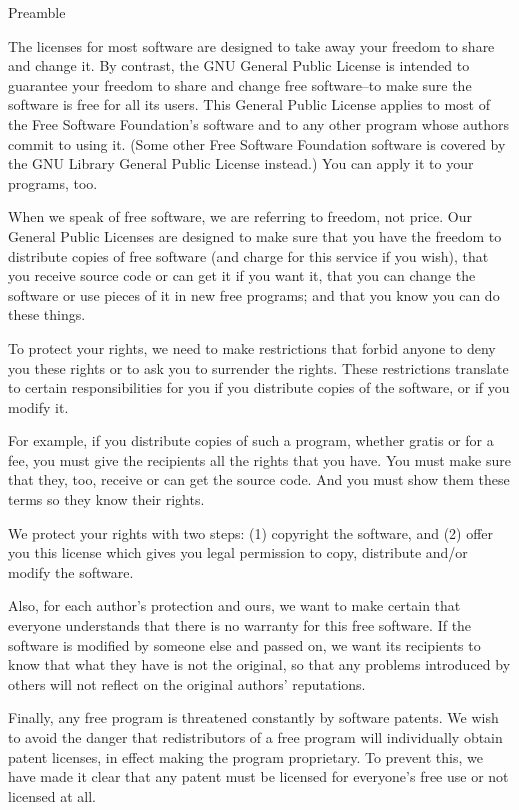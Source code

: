 \begin{center}
Preamble
\end{center}

The licenses for most software are designed to take away your
freedom to share and change it.  By contrast, the GNU General Public
License is intended to guarantee your freedom to share and change free
software--to make sure the software is free for all its users.  This
General Public License applies to most of the Free Software
Foundation's software and to any other program whose authors commit to
using it.  (Some other Free Software Foundation software is covered by
the GNU Library General Public License instead.)  You can apply it to
your programs, too.

When we speak of free software, we are referring to freedom, not
price.  Our General Public Licenses are designed to make sure that you
have the freedom to distribute copies of free software (and charge for
this service if you wish), that you receive source code or can get it
if you want it, that you can change the software or use pieces of it
in new free programs; and that you know you can do these things.

To protect your rights, we need to make restrictions that forbid
anyone to deny you these rights or to ask you to surrender the rights.
These restrictions translate to certain responsibilities for you if you
distribute copies of the software, or if you modify it.

For example, if you distribute copies of such a program, whether
gratis or for a fee, you must give the recipients all the rights that
you have.  You must make sure that they, too, receive or can get the
source code.  And you must show them these terms so they know their
rights.

We protect your rights with two steps: (1) copyright the software, and
(2) offer you this license which gives you legal permission to copy,
distribute and/or modify the software.

Also, for each author's protection and ours, we want to make certain
that everyone understands that there is no warranty for this free
software.  If the software is modified by someone else and passed on, we
want its recipients to know that what they have is not the original, so
that any problems introduced by others will not reflect on the original
authors' reputations.

Finally, any free program is threatened constantly by software
patents.  We wish to avoid the danger that redistributors of a free
program will individually obtain patent licenses, in effect making the
program proprietary.  To prevent this, we have made it clear that any
patent must be licensed for everyone's free use or not licensed at all.

